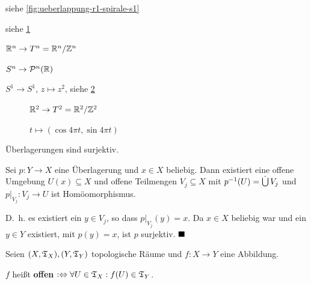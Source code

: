 \begin{beispiel}
    \begin{bspenum}
        \item siehe \cref{fig:ueberlappung-r1-spirale-s1}
        \item siehe \cref{fig:ueberlappung-kaestchen-torus}
        \item $\mathbb{R}^n \rightarrow T^n = \mathbb{R}^n / \mathbb{Z}^n$
        \item $S^n \rightarrow \mathcal{P}^n(\mathbb{R})$
        \item $S^1 \rightarrow S^1$, $z \mapsto z^2$, siehe \cref{fig:liftung-s1-s1}
    \end{bspenum}

    \begin{figure}[htp]
        \centering
        \resizebox{0.95\linewidth}{!}{}
        \caption{$\mathbb{R}^2 \rightarrow T^2 = \mathbb{R}^2 / \mathbb{Z}^2$}
        \label{fig:ueberlappung-kaestchen-torus}
    \end{figure}
    \begin{figure}[htp]
        \centering
        
        \caption{$t \mapsto (\cos 4 \pi t, \sin 4 \pi t)$}
        \label{fig:liftung-s1-s1}
    \end{figure}
\end{beispiel}

\begin{bemerkung}
    Überlagerungen sind surjektiv.
\end{bemerkung}

\begin{beweis}
    Sei $p: Y \rightarrow X$ eine Überlagerung und $x \in X$ beliebig.
    Dann existiert eine offene Umgebung $U(x) \subseteq X$ und offene
    Teilmengen $V_j \subseteq X$ mit 
    $p^{-1}(U) = \mathop{\dot{\bigcup}} V_j$ und
    $p|_{V_j}: V_j \rightarrow U$ ist Homöomorphismus.

    D.~h. es existiert ein $y \in V_j$, so dass $p|_{V_j}(y) = x$.
    Da $x \in X$ beliebig war und ein $y \in Y$ existiert, mit 
    $p(y) = x$, ist $p$ surjektiv.    $\qed$
\end{beweis}

\begin{definition}%
    Seien $(X, \mathfrak{T}_X), (Y, \mathfrak{T}_Y)$ topologische Räume und $f:X \rightarrow Y$ eine 
    Abbildung.

    $f$ heißt \textbf{offen} $:\Leftrightarrow \forall U \in \mathfrak{T}_X: f(U) \in \mathfrak{T}_Y$.
\end{definition}

